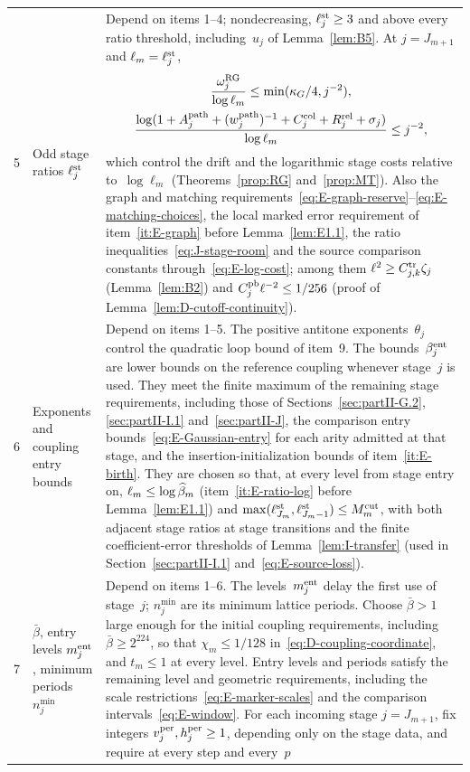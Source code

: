 \begin{longtable}{@{}p{}p{}p{}@{}}
5 & \raggedright Odd stage ratios $\ell_j^{\rm st}$ & Depend on items 1--4; nondecreasing, $\ell_j^{\rm st}\ge3$ and above every ratio threshold, including~$u_j$ of Lemma~\ref{lem:B5}. At $j=J_{m+1}$ and $\ell_m=\ell_j^{\rm st}$,
\begin{gather*}
\frac{\omega_j^{\rm RG}}{\log\ell_m}\le\min(\kappa_G/4,j^{-2}),\\
\frac{\log(1+A_j^{\rm path}+(w_j^{\rm path})^{-1}+C^{\mathrm{col}}_{j}+R_j^{\rm rel}+\sigma_j)}{\log\ell_m}\le j^{-2},
\end{gather*}
which control the drift and the logarithmic stage costs relative to~$\log\ell_m$ (Theorems~\ref{prop:RG} and~\ref{prop:MT}). Also the graph and matching requirements~\eqref{eq:E-graph-reserve}--\eqref{eq:E-matching-choices}, the local marked error requirement of item~\ref{it:E-graph} before Lemma~\ref{lem:E1.1}, the ratio inequalities~\eqref{eq:J-stage-room} and the source comparison constants through~\eqref{eq:E-log-cost}; among them $\ell^2\ge C^{\rm tr}_{j,k}\zeta_j$ (Lemma~\ref{lem:B2}) and $C_j^{\rm pb}\ell^{-2}\le1/256$ (proof of Lemma~\ref{lem:D-cutoff-continuity}).\\[3pt]
6 & \raggedright Exponents and coupling entry bounds & Depend on items 1--5. The positive antitone exponents~$\theta_j$ control the quadratic loop bound of item~9. The bounds~$\beta_j^{\rm ent}$ are lower bounds on the reference coupling whenever stage~$j$ is used. They meet the finite maximum of the remaining stage requirements, including those of Sections~\ref{sec:partII-G.2}, \ref{sec:partII-I.1} and~\ref{sec:partII-J}, the comparison entry bounds~\eqref{eq:E-Gaussian-entry} for each arity admitted at that stage, and the insertion-initialization bounds of item~\ref{it:E-birth}. They are chosen so that, at every level from stage entry on, $\ell_m\le\log\widehat{\beta}_m$ (item~\ref{it:E-ratio-log} before Lemma~\ref{lem:E1.1}) and $\max(\ell^{\rm st}_{J_m},\ell^{\rm st}_{J_m-1})\le M^{\mathrm{cut}}_m$, with both adjacent stage ratios at stage transitions and the finite coefficient-error thresholds of Lemma~\ref{lem:I-transfer} (used in Section~\ref{sec:partII-I.1} and~\eqref{eq:E-source-loss}).\\[3pt]
7 & \raggedright $\bar\beta$, entry levels $m_j^{\rm ent}$, minimum periods $n_j^{\min}$ & Depend on items 1--6. The levels~$m_j^{\rm ent}$ delay the first use of stage~$j$; $n_j^{\min}$ are its minimum lattice periods. Choose $\bar\beta>1$ large enough for the initial coupling requirements, including $\bar\beta\ge2^{224}$, so that $\chi_m\le1/128$ in~\eqref{eq:D-coupling-coordinate}, and $t_m\le1$ at every level. Entry levels and periods satisfy the remaining level and geometric requirements, including the scale restrictions~\eqref{eq:E-marker-scales} and the comparison intervals~\eqref{eq:E-window}. For each incoming stage $j=J_{m+1}$, fix integers $v_j^{\rm per},h_j^{\rm per}\ge1$, depending only on the stage data, and require at every step and every~$p$

\end{longtable}
